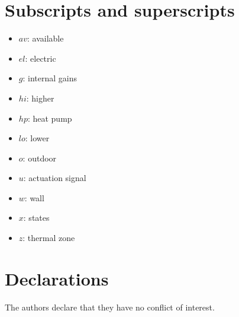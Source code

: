 \section{Subscripts and superscripts}

\begin{itemize}
    \item{$av$: available}
    \item{$el$: electric}
    \item{$g$: internal gains}
    \item{$hi$: higher}
    \item{$hp$: heat pump}
    \item{$lo$: lower}
    \item{$o$: outdoor}
    \item{$u$: actuation signal}
    \item{$w$: wall}
    \item{$x$: states}
    \item{$z$: thermal zone}
\end{itemize}




%
\section*{Declarations}
The authors declare that they have no conflict of interest.
